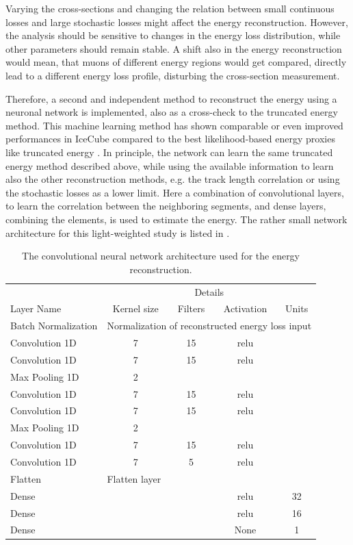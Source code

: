 Varying the cross-sections and changing the relation between small continuous losses and large stochastic losses might affect the energy reconstruction.
However, the analysis should be sensitive to changes in the energy loss distribution, while other parameters should remain stable.
A shift also in the energy reconstruction would mean, that muons of different energy regions would get compared, directly lead to a different energy loss profile, disturbing the cross-section measurement.

Therefore, a second and independent method to reconstruct the energy using a neuronal network is implemented, also as a cross-check to the truncated energy method.
This machine learning method has shown comparable or even improved performances in IceCube compared to the best likelihood-based energy proxies like truncated energy \cite{Huennefeld17ICRC, Huennefeld19VLVNT}.
In principle, the network can learn the same truncated energy method described above, while using the available information to learn also the other reconstruction methods, e.g. the track length correlation or using the stochastic losses as a lower limit.
Here a combination of convolutional layers, to learn the correlation between the neighboring segments, and dense layers, combining the elements, is used to estimate the energy.
The rather small network architecture for this light-weighted study is listed in .
\begin{table}
    \caption{The convolutional neural network architecture used for the energy reconstruction.}
    \label{tab:nn_layers_ereco}
    \centering
    \begin{tabular}{l | c c c c}
        \toprule
         & \multicolumn{4}{c}{Details} \\
        Layer Name & Kernel size & Filters & Activation & Units \\
        \midrule
        Batch Normalization & \multicolumn{4}{l}{Normalization of reconstructed energy loss input} \\ \cline{2-5}
        Convolution 1D & 7 & 15 & relu & \\
        Convolution 1D & 7 & 15 & relu & \\
        Max Pooling 1D & 2 & & & \\
        Convolution 1D & 7 & 15 & relu & \\
        Convolution 1D & 7 & 15 & relu & \\
        Max Pooling 1D & 2 & & & \\
        Convolution 1D & 7 & 15 & relu & \\
        Convolution 1D & 7 & 5  & relu & \\  \cline{2-5}
        Flatten & \multicolumn{4}{l}{Flatten layer} \\  \cline{2-5}
        Dense & & & relu & 32 \\
        Dense & & & relu & 16 \\
        Dense & & & None & 1\\
        \bottomrule                          
    \end{tabular}
\end{table}

